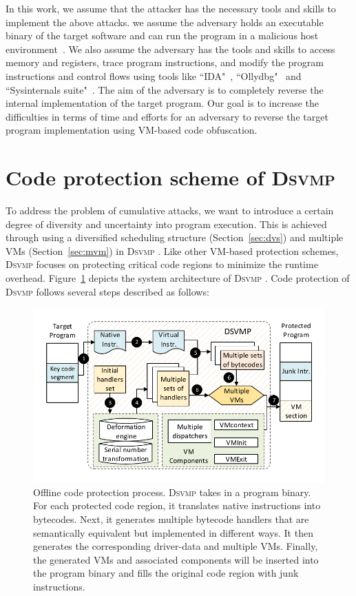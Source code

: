 \documentclass[preprint,12pt,3p]{elsarticle}
\newcommand{\DSVMP}{\textsc{Dsvmp }}
\begin{document}
In this work, we assume that the attacker has the necessary tools and skills to implement the above attacks.
we assume the adversary holds an executable binary of the
target software and can run the program in a malicious host
environment~\cite{11collberg2002watermarking}. We also assume the adversary
has the tools and skills to access memory and registers, trace program
instructions, and modify the program instructions and control flows using
tools like ``IDA"~\cite{14Idapro}, ``Ollydbg"~\cite{15Ollydbg} and
``Sysinternals suite"~\cite{16Sysinternalssuite}. The aim of the adversary is
to completely reverse the internal implementation of the target program.
Our goal is to increase the difficulties in terms of time and efforts for an adversary to
reverse the target program implementation using VM-based code obfuscation.


\section{Code protection scheme of \DSVMP}\label{sec:overview}
To address the problem of cumulative attacks, we want to introduce a certain
degree of diversity and uncertainty into program execution. This is achieved
through using a diversified scheduling structure (Section~\ref {sec:dvs}) and
multiple VMs (Section~\ref {sec:mvm}) in \DSVMP. Like other VM-based protection schemes,
\DSVMP focuses on protecting critical code regions to minimize the runtime overhead.
Figure~\ref{fig:Fig.2} depicts the system architecture of \DSVMP.
Code protection of \DSVMP follows several steps described as follows:

\begin{figure}[!t]
  \centering
  \includegraphics[width=0.7\columnwidth]{figure/figtwo.pdf}
  \caption{Offline code protection process. \DSVMP takes in a program binary. For each protected code region, it translates native instructions into bytecodes. Next, it generates multiple bytecode handlers that are semantically equivalent but implemented in different ways. It then generates the corresponding driver-data and multiple VMs. Finally, the generated VMs and associated components will be inserted into the program binary and fills the original code region with junk instructions.}\label{fig:Fig.2}
\end{figure}
\end{document}
